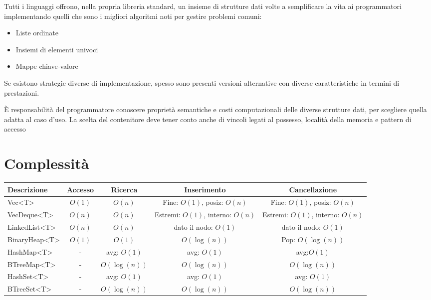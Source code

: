 Tutti i linguaggi offrono, nella propria libreria standard, un insieme di
strutture dati volte a semplificare la vita ai programmatori implementando
quelli che sono i migliori algoritmi noti per gestire problemi comuni:

\begin{itemize}
  \item Liste ordinate
  \item Insiemi di elementi univoci
  \item Mappe chiave-valore
\end{itemize}

Se esistono strategie diverse di implementazione, spesso sono presenti versioni
alternative con diverse caratteristiche in termini di prestazioni.


È responsabilità del programmatore conoscere proprietà semantiche e costi
computazionali delle diverse strutture dati, per scegliere quella adatta al caso
d'uso. La scelta del contenitore deve tener conto anche di vincoli legati al
possesso, località della memoria e pattern di accesso

\section{Complessità}
\begin{table}[h!]
  \renewcommand{\arraystretch}{1.5}
  \centering
  \begin{tabularx}{\textwidth}{l c c c c}
    \toprule
    \textbf{Descrizione} & \textbf{Accesso} & \textbf{Ricerca} & \textbf{Inserimento}             & \textbf{Cancellazione}           \\
    \midrule
    Vec<T>               & $O(1)$           & $O(n)$           & Fine: $O(1)$, posiz: $O(n)$      & Fine: $O(1)$, posiz: $O(n)$      \\
    VecDeque<T>          & $O(n)$           & $O(n)$           & Estremi: $O(1)$, interno: $O(n)$ & Estremi: $O(1)$, interno: $O(n)$ \\
    LinkedList<T>        & $O(n)$           & $O(n)$           & dato il nodo: $O(1)$             & dato il nodo: $O(1)$             \\
    BinaryHeap<T>        & $O(1)$           & $O(1)$           & $O(\log(n))$                     & Pop: $O(\log(n))$                \\
    HashMap<T>           & -                & avg: $O(1)$      & avg: $O(1)$                      & avg:$O(1)$                       \\
    BTreeMap<T>          & -                & $O(\log(n))$     & $O(\log(n))$                     & $O(\log(n))$                     \\
    HashSet<T>           & -                & avg: $O(1)$      & avg: $O(1)$                      & avg: $O(1)$                      \\
    BTreeSet<T>          & -                & $O(\log(n))$     & $O(\log(n))$                     & $O(\log(n))$                     \\
    \bottomrule
  \end{tabularx}
\end{table}

